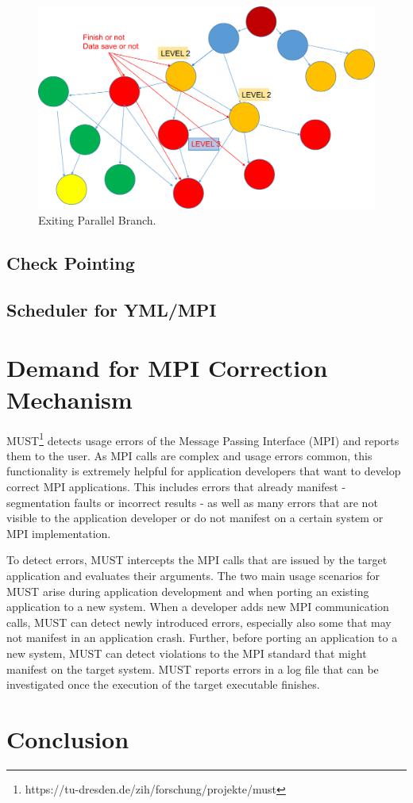 \begin{figure}[htbp]
	\centering
	\includegraphics[width=5.in]{fig/exit-branch.pdf}
	\caption{Exiting Parallel Branch.}
	\label{fig:exit}
\end{figure}

\subsection{Check Pointing}

\subsection{Scheduler for YML/MPI}
\section{Demand for MPI Correction Mechanism}

MUST\footnote{https://tu-dresden.de/zih/forschung/projekte/must} detects usage errors of the Message Passing Interface (MPI) and reports them to the user. As MPI calls are complex and usage errors common, this functionality is extremely helpful for application developers that want to develop correct MPI applications. This includes errors that already manifest - segmentation faults or incorrect results - as well as many errors that are not visible to the application developer or do not manifest on a certain system or MPI implementation.

To detect errors, MUST intercepts the MPI calls that are issued by the target application and evaluates their arguments. The two main usage scenarios for MUST arise during application development and when porting an existing application to a new system. When a developer adds new MPI communication calls, MUST can detect newly introduced errors, especially also some that may not manifest in an application crash. Further, before porting an application to a new system, MUST can detect violations to the MPI standard that might manifest on the target system. MUST reports errors in a log file that can be investigated once the execution of the target executable finishes.
\section{Conclusion}

\clearemptydoublepage
\backmatter

\clearemptydoublepage